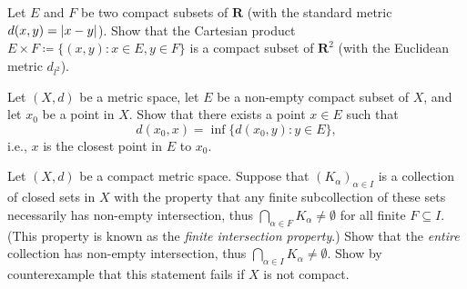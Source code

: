 \begin{exercise}\label{ex 1.5.13}
    Let \(E\) and \(F\) be two compact subsets of \(\mathbf{R}\) (with the standard metric \(d(x, y) = \abs*{x - y}\)).
    Show that the Cartesian product \(E \times F \coloneqq \{(x, y) : x \in E, y \in F\}\) is a compact subset of \(\mathbf{R}^2\) (with the Euclidean metric \(d_{l^2}\)).
\end{exercise}

\begin{exercise}\label{ex 1.5.14}
    Let \((X, d)\) be a metric space, let \(E\) be a non-empty compact subset of \(X\), and let \(x_0\) be a point in \(X\).
    Show that there exists a point \(x \in E\) such that
    \[
        d(x_0, x) = \inf\{d(x_0, y) : y \in E\},
    \]
    i.e., \(x\) is the closest point in \(E\) to \(x_0\).
\end{exercise}

\begin{exercise}\label{ex 1.5.15}
    Let \((X, d)\) be a compact metric space.
    Suppose that \((K_{\alpha})_{\alpha \in I}\) is a collection of closed sets in \(X\) with the property that any finite subcollection of these sets necessarily has non-empty intersection, thus \(\bigcap_{\alpha \in F} K_{\alpha} \neq \emptyset\) for all finite \(F \subseteq I\).
    (This property is known as the \emph{finite intersection property}.)
    Show that the \emph{entire} collection has non-empty intersection, thus \(\bigcap_{\alpha \in I} K_{\alpha} \neq \emptyset\).
    Show by counterexample that this statement fails if \(X\) is not compact.
\end{exercise}